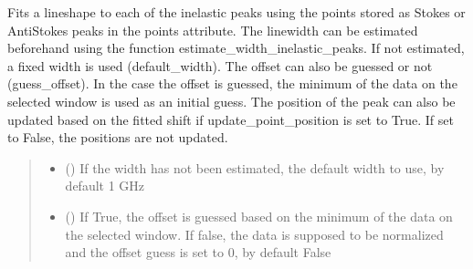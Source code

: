 \documentclass[letterpaper,10pt,english]{sphinxmanual}
\begin{document}
\begin{fulllineitems}
\begin{fulllineitems}
\label{\detokenize{source/_autosummary/HDF5_BLS_treat.Treat:HDF5_BLS_treat.Treat.fit_all_inelastic_of_curve}}
\pysigstartsignatures
\pysiglinewithargsret
{}
{\sphinxparamcomma {}\sphinxparamcomma {}\sphinxparamcomma {}\sphinxparamcomma {}}
{}
\pysigstopsignatures
\sphinxAtStartPar
Fits a lineshape to each of the inelastic peaks using the points stored as Stokes or Anti\sphinxhyphen{}Stokes peaks in the points attribute. The linewidth can be estimated beforehand using the function estimate\_width\_inelastic\_peaks. If not estimated, a fixed width is used (default\_width). The offset can also be guessed or not (guess\_offset). In the case the offset is guessed, the minimum of the data on the selected window is used as an initial guess. The position of the peak can also be updated based on the fitted shift if update\_point\_position is set to True. If set to False, the positions are not updated.
\begin{quote}\begin{description}
\begin{itemize}
\item {} 
\sphinxAtStartPar
{} (\sphinxstyleliteralemphasis{\sphinxupquote{, }}) \textendash{} If the width has not been estimated, the default width to use, by default 1 GHz

\item {} 
\sphinxAtStartPar
{} (\sphinxstyleliteralemphasis{\sphinxupquote{, }}) \textendash{} If True, the offset is guessed based on the minimum of the data on the selected window. If false, the data is supposed to be normalized and the offset guess is set to 0, by default False


\end{itemize}
\end{description}
\end{quote}
\end{fulllineitems}
\end{fulllineitems}
\end{document}
